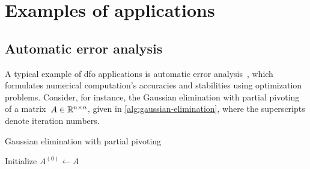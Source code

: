 \section{Examples of applications}

\subsection{Automatic error analysis}

A typical example of \gls{dfo} applications is automatic error analysis~\cite{Higham_1993,Higham_2002}, which formulates numerical computation's accuracies and stabilities using optimization problems.
Consider, for instance, the Gaussian elimination with partial pivoting of a matrix~$A \in \mathbb{R}^{n \times n}$, given in \cref{alg:gaussian-elimination}, where the superscripts denote iteration numbers.

\begin{algorithm}[ht]
    \caption{Gaussian elimination with partial pivoting}
    \label{alg:gaussian-elimination}
    \DontPrintSemicolon
    Initialize $A^{(0)} \gets A$\;
\end{algorithm}


